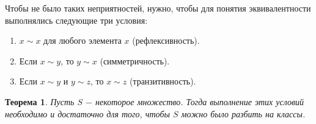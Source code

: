 \documentclass{article}
\newtheorem{theorem}{Теорема}[section]
\begin{document}
Чтобы не было таких неприятностей, нужно, чтобы для понятия эквивалентности выполнялись следующие три условия:

\begin{enumerate}
  \item \(x \sim x\) для любого элемента \(x\) (рефлексивность).
  \item Если \(x \sim y\), то \(y \sim x\) (симметричность).
  \item Если \(x \sim y\) и \(y \sim z\), то \(x \sim z\) (транзитивность).
\end{enumerate}

\begin{theorem}
Пусть \(S\) \(-\) некоторое множество. Тогда выполнение этих условий необходимо и достаточно для того, чтобы \(S\) можно было разбить на классы.
\end{theorem}
\end{document}

